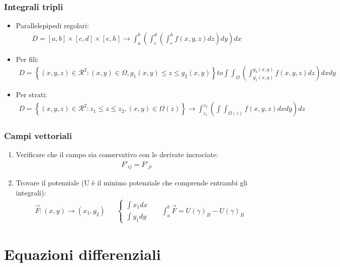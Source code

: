 \documentclass[a4paper]{article}
\begin{document}
	\subsubsection{Integrali tripli}
	\begin{itemize}
		\item Parallelepipedi regolari:
		\begin{align*}
			D = [a,b] \times [c,d] \times [e,h] \to \int_{a}^{b}\left( \int_{c}^{d} \left( \int_{e}^{h} f(x,y,z) dz \right) dy \right) dx
		\end{align*}		
		\item Per fili:
		\begin{align*}
			D = \left\lbrace  (x,y,z) \in \mathcal{R}^2:(x,y) \in \Omega,g_1(x,y) \le z \le g_2(x,y) \right\rbrace to \int \int_{\Omega} \left( \int_{g_1(x,y)}^{g_2(x,y)}f(x,y,z)dz \right)dxdy
		\end{align*}
		\item Per strati:
		\begin{align*}
		D =	\left\lbrace (x,y,z) \in \mathcal{R}^2:z_1 \le z \le z_2 , (x,y) \in \Omega (z) \right\rbrace \to \int_{z_1}^{z_2} \left( \int \int_{\Omega (z)} f(x,y,z)dxdy \right)dz
		\end{align*}
	\end{itemize}
	\subsubsection{Campi vettoriali}
	\begin{enumerate}
		\item Verificare che il campo sia conservativo con le derivate incrociate:
		\begin{align*}
			F'_{ij} = F'_{ji}
		\end{align*}
		\item Trovare il potenziale (U è il minimo potenziale che comprende entrambi gli integrali):
		\begin{align*}
			&\vec{F}:(x,y) \to (x_1,y_2)	&	&\begin{cases}
			\int x_1 dx\\
			\int y_1 dy
			\end{cases}	&	&\int_{a}^{b}\vec{F} = U(\gamma)_B - U(\gamma)_B
		\end{align*}
	\end{enumerate}
	
	\newpage
	\section{Equazioni differenziali}
\end{document}
